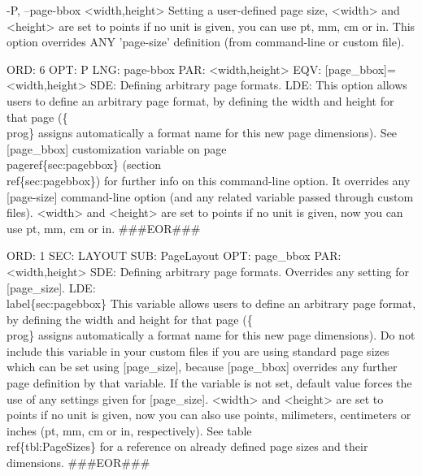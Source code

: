 \documentclass[11pt]{article}
\def\nwendcode{\endtrivlist \endgroup} %
\let\nwdocspar=\par                    %
\begin{document}
\nwenddocs{}\plusendmoddef
-P, --page-bbox  <width,height>
      Setting a user-defined page size, <width> and
      <height> are set to points if no unit is given,
      you can use pt, mm, cm or in. This option overrides ANY
      'page-size' definition (from command-line or custom file).
\nwendcode{}\nwdocspar
\nwenddocs{}\plusendmoddef
ORD: 6
OPT: P
LNG: page-bbox
PAR: <width,height>
EQV: [page_bbox]=<width,height>
SDE: Defining arbitrary page formats.
LDE: 
This option allows users to define an arbitrary page format, by
defining the width and height for that page (\{\\prog\} assigns 
automatically a format name for this new page dimensions). 
See [page_bbox] customization variable on page~\\pageref\{sec:pagebbox\} 
(section~\\ref\{sec:pagebbox\}) for further info on this command-line option.
It overrides any [page-size] command-line option (and any related variable 
passed through custom files). <width> and <height> are set to points 
if no unit is given, now you can use pt, mm, cm or in.
###EOR###
\nwendcode{}\nwdocspar
\nwenddocs{}\plusendmoddef
ORD: 1
SEC: LAYOUT
SUB: PageLayout
OPT: page_bbox
PAR: <width,height>
SDE: Defining arbitrary page formats. Overrides any setting for [page_size].
LDE:
\\label\{sec:pagebbox\}
This variable allows users to define an arbitrary page format, by
defining the width and height for that page (\{\\prog\} assigns 
automatically a format name for this new page dimensions). 
Do not include this variable in your custom files if you are
using standard page sizes which can be set using [page_size], because
[page_bbox] overrides any further page definition by that variable. If
the variable is not set, default value forces the use of any settings
given for [page_size]. <width> and <height> are set to points if no unit is
given, now you can also use points, milimeters, centimeters or inches (pt, 
mm, cm or in, respectively). See table~\\ref\{tbl:PageSizes\} for a reference
on already defined page sizes and their dimensions.
###EOR###
\nwendcode{}\nwdocspar
\end{document}
